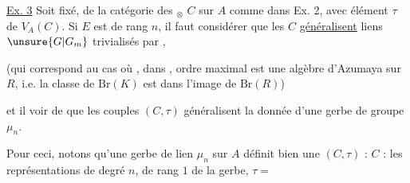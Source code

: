 
\uline{Ex. 3} Soit fixé,   de la catégorie des
$_{\otimes}$ $C$ sur $A$ comme dans Ex. 2, avec
élément $\tau$ de $V_A(C)$. Si $E$ est  de rang $n$,
il faut considérer que les $C$ \uline{généralisent} 
 liens $\unsure{G|G_m}$  trivialisés par ,

(qui correspond au cas où , dans , ordre maximal est 
une algèbre d'Azumaya sur $R$, i.e. la classe de  $\mathrm{Br}(K)$ est dans
l'image de $\mathrm{Br}(R)$)



et il  voir de  que les couples $(C,\tau)$
généralisent la donnée d'une gerbe de groupe $\mu_n$.

Pour ceci,  notons  qu'une
gerbe de lien $\mu_n$ sur $A$ définit bien une $(C,\tau)$ :
$C$ : les  représentations de degré $n$, de rang $1$
de la gerbe, $\tau=$ 

